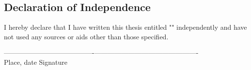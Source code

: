 
\begin{blackframebox}
	\section*{Declaration of Independence}
	I hereby declare that I have written this thesis entitled "\thesistitle" independently and have not used any sources or aids other than those specified.
	
	\vspace{4\baselineskip}
	----------------------------------------\hfill----------------------------------------------\\
	Place, date \hspace{183pt} Signature
\end{blackframebox}